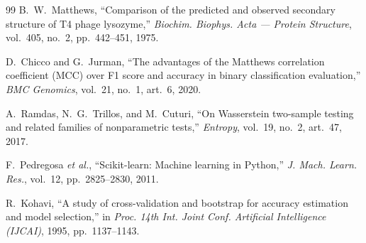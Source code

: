 \documentclass[11pt,a4paper]{article}
\begin{document}
\begin{thebibliography}{99}
 B.~W.~Matthews, ``Comparison of the predicted and observed
secondary structure of T4 phage lysozyme,'' \emph{Biochim. Biophys. Acta ---
Protein Structure}, vol.~405, no.~2, pp.~442--451, 1975.

 D.~Chicco and G.~Jurman, ``The advantages of the Matthews
correlation coefficient (MCC) over F1 score and accuracy in binary
classification evaluation,'' \emph{BMC Genomics}, vol.~21, no.~1, art.~6, 2020.

 A.~Ramdas, N.~G.~Trillos, and M.~Cuturi, ``On Wasserstein
two-sample testing and related families of nonparametric tests,''
\emph{Entropy}, vol.~19, no.~2, art.~47, 2017.

 F.~Pedregosa \emph{et al.}, ``Scikit-learn: Machine learning
in Python,'' \emph{J. Mach. Learn. Res.}, vol.~12, pp.~2825--2830, 2011.

 R.~Kohavi, ``A study of cross-validation and bootstrap for
accuracy estimation and model selection,'' in \emph{Proc. 14th Int. Joint Conf.
Artificial Intelligence (IJCAI)}, 1995, pp.~1137--1143.

\end{thebibliography}
\end{document}

